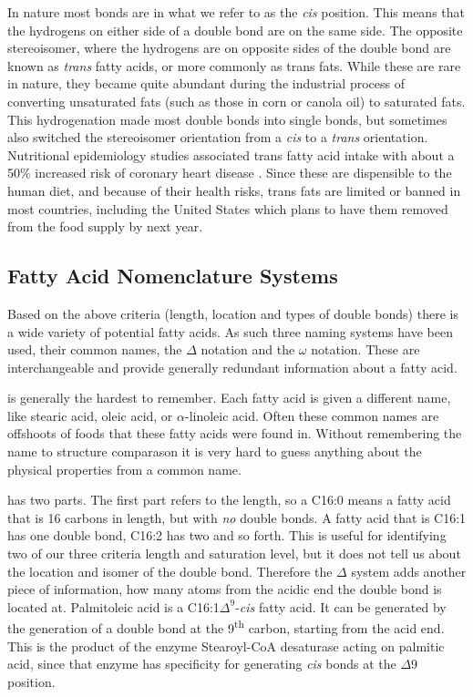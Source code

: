 \documentclass{tufte-handout}
\begin{document}
  In nature most bonds are in what we refer to as the \textit{cis} position.  This means that the hydrogens on either side of a double bond are on the same side.  The opposite stereoisomer, where the hydrogens are on opposite sides of the double bond are known as \textit{trans} fatty acids, or more commonly as trans fats.  While these are rare in nature, they became quite abundant during the industrial process of converting unsaturated fats (such as those in corn or canola oil) to saturated fats.  This hydrogenation made most double bonds into single bonds, but sometimes also switched the stereoisomer orientation from a \textit{cis} to a \textit{trans} orientation.  Nutritional epidemiology studies associated trans fatty acid intake with about a 50\% increased risk of coronary heart disease \citep{Willett1993}.  Since these are dispensible to the human diet, and because of their health risks, trans fats are limited or banned in most countries, including the United States which plans to have them removed from the food supply by next year.  

\subsection{Fatty Acid Nomenclature Systems}

Based on the above criteria (length, location and types of double bonds) there is a wide variety of potential fatty acids.  As such three naming systems have been used, their common names, the $\Delta$ notation and the $\omega$ notation.  These are interchangeable and provide generally redundant information about a fatty acid.

 is generally the hardest to remember.  Each fatty acid is given a different name, like stearic acid, oleic acid, or $\alpha$-linoleic acid.  Often these common names are offshoots of foods that these fatty acids were found in.  Without remembering the name to structure comparason it is very hard to guess anything about the physical properties from a common name.

 has two parts.  The first part refers to the length, so a C16:0 means a fatty acid that is 16 carbons in length, but with \emph{no} double bonds.  A fatty acid that is C16:1 has one double bond, C16:2 has two and so forth.  This is useful for identifying two of our three criteria length and saturation level, but it does not tell us about the location and isomer of the double bond.  Therefore the $\Delta$ system adds another piece of information, how many atoms from the acidic end the double bond is located at.  Palmitoleic acid is a C16:1$\Delta^9$-\textit{cis} fatty acid.  It can be generated by the generation of a double bond at the 9\textsuperscript{th} carbon, starting from the acid end.  This is the product of the enzyme Stearoyl-CoA desaturase acting on palmitic acid, since that enzyme has specificity for generating \textit{cis} bonds at the $\Delta$9 position.
\end{document}
